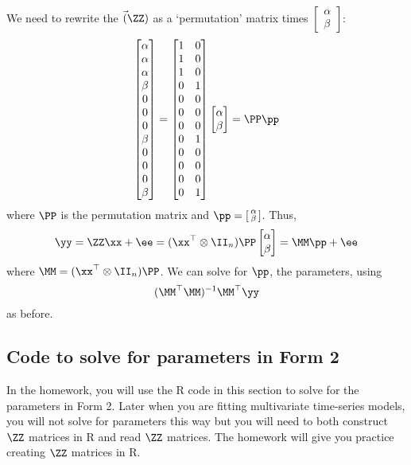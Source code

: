 We need to rewrite the $\vec(\ZZ)$ as a `permutation' matrix times $\left[ \begin{smallmatrix}\alpha\\\beta\end{smallmatrix} \right]$:
\begin{equation}
\begin{bmatrix}
\alpha\\
\alpha\\
\alpha\\
\beta\\
0\\
0\\
0\\
\beta\\
0\\
0\\
0\\
\beta
\end{bmatrix}
=
\begin{bmatrix}
1&0\\
1&0\\
1&0\\
0&1\\
0&0\\
0&0\\
0&0\\
0&1\\
0&0\\
0&0\\
0&0\\
0&1\\
\end{bmatrix}
\begin{bmatrix}
\alpha\\
\beta
\end{bmatrix} = \PP\pp
\end{equation}
where $\PP$ is the permutation matrix and $\pp=\left[ \begin{smallmatrix}\alpha\\\beta\end{smallmatrix} \right]$.
Thus,
\begin{equation}
\yy=\ZZ\xx+\ee = (\xx^\top \otimes \II_n)\PP\begin{bmatrix}\alpha\\ \beta\end{bmatrix} = \MM\pp + \ee
\end{equation}
where $\MM=(\xx^\top \otimes \II_n)\PP$.
We can solve for $\pp$, the parameters, using 
$$(\MM^\top\MM)^{-1}\MM^\top\yy$$
as before.  

\subsection{Code to solve for parameters in Form 2}\label{solvecodeform2}
In the homework, you will use the R code in this section to solve for the parameters in Form 2.  Later when you are fitting multivariate time-series models, you will not solve for parameters this way but you will need to both construct $\ZZ$ matrices in R and read $\ZZ$ matrices. The homework will give you practice creating $\ZZ$ matrices in R.

